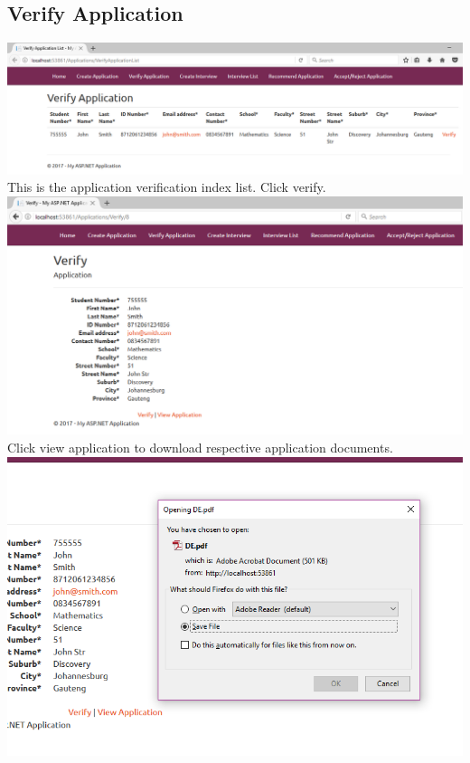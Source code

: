 \documentclass{article}
\begin{document}
\subsection{Verify Application}
\begin{center}
\includegraphics[scale=0.5]{VerifyApplication.png}\\
This is the application verification index list. Click verify.\\ \bigskip
\includegraphics[scale=0.5]{VerifyApplication2.png}\\
Click view application to download respective application documents.\\ \bigskip
\includegraphics[scale=0.5]{VerifyApplication3.png}\\

\end{center}
\end{document}
